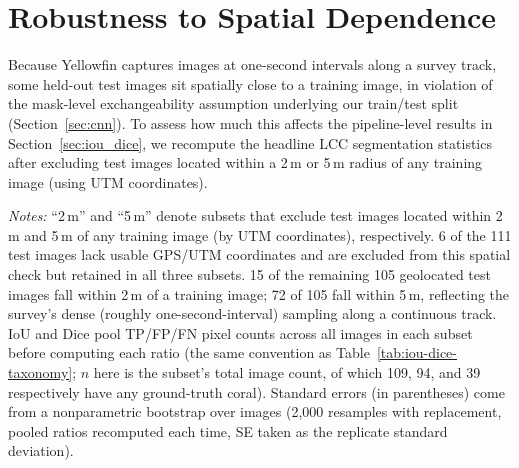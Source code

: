 \documentclass[11pt]{elsarticle}
\begin{document}
\appendix
\section{Robustness to Spatial Dependence}
\label{app:spatial}

Because Yellowfin captures images at one-second intervals along a survey track, some held-out test images sit spatially close to a training image, in violation of the mask-level exchangeability assumption underlying our train/test split (Section~\ref{sec:cnn}). To assess how much this affects the pipeline-level results in Section~\ref{sec:iou_dice}, we recompute the headline LCC segmentation statistics after excluding test images located within a 2\,m or 5\,m radius of any training image (using UTM coordinates).

\begin{table}[htbp]
\centering
\caption{Live coral cover IoU, Dice, and pixel accuracy on the test set, with vs.\ without spatially-contaminated test images excluded.}
\label{tab:spatial-robustness}
\begin{tablenotes}
\item \emph{Notes:} ``2\,m'' and ``5\,m'' denote subsets that exclude test images located within 2\,m and 5\,m of any training image (by UTM coordinates), respectively. 6 of the 111 test images lack usable GPS/UTM coordinates and are excluded from this spatial check but retained in all three subsets. 15 of the remaining 105 geolocated test images fall within 2\,m of a training image; 72 of 105 fall within 5\,m, reflecting the survey's dense (roughly one-second-interval) sampling along a continuous track. IoU and Dice pool TP/FP/FN pixel counts across all images in each subset before computing each ratio (the same convention as Table~\ref{tab:iou-dice-taxonomy}; $n$ here is the subset's total image count, of which 109, 94, and 39 respectively have any ground-truth coral). Standard errors (in parentheses) come from a nonparametric bootstrap over images (2,000 resamples with replacement, pooled ratios recomputed each time, SE taken as the replicate standard deviation).
\end{tablenotes}
\end{table}
\end{document}

